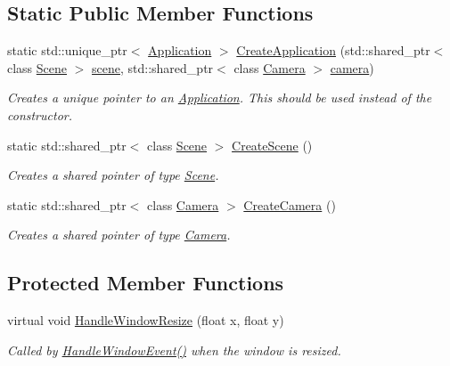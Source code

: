 \subsection*{Static Public Member Functions}
\begin{DoxyCompactItemize}
\item 
static std\+::unique\+\_\+ptr$<$ \hyperlink{class_application}{Application} $>$ \hyperlink{class_application_a727f63f898a68bddf6d88309195ef194}{Create\+Application} (std\+::shared\+\_\+ptr$<$ class \hyperlink{class_scene}{Scene} $>$ \hyperlink{class_application_a88c6615107a5094bb93fa5f153f79554}{scene}, std\+::shared\+\_\+ptr$<$ class \hyperlink{class_camera}{Camera} $>$ \hyperlink{class_application_a0e8589fcb13c520ba472473abe5a518d}{camera})
\begin{DoxyCompactList}\small\item\em Creates a unique pointer to an \hyperlink{class_application}{Application}. This should be used instead of the constructor. \end{DoxyCompactList}\item 
static std\+::shared\+\_\+ptr$<$ class \hyperlink{class_scene}{Scene} $>$ \hyperlink{class_application_a511e638cf5748e10151f17d6140b9119}{Create\+Scene} ()
\begin{DoxyCompactList}\small\item\em Creates a shared pointer of type \hyperlink{class_scene}{Scene}. \end{DoxyCompactList}\item 
static std\+::shared\+\_\+ptr$<$ class \hyperlink{class_camera}{Camera} $>$ \hyperlink{class_application_a53c0a539fd2c4fe2cc48143cc0a3ea24}{Create\+Camera} ()
\begin{DoxyCompactList}\small\item\em Creates a shared pointer of type \hyperlink{class_camera}{Camera}. \end{DoxyCompactList}\end{DoxyCompactItemize}
\subsection*{Protected Member Functions}
\begin{DoxyCompactItemize}
\item 
virtual void \hyperlink{class_application_abdba284a0f075ee1d4a2108c3a5236a2}{Handle\+Window\+Resize} (float x, float y)
\begin{DoxyCompactList}\small\item\em Called by \hyperlink{class_application_a74d92db64e051efa56d0357989dcb755}{Handle\+Window\+Event()} when the window is resized. \end{DoxyCompactList}\end{DoxyCompactItemize}
